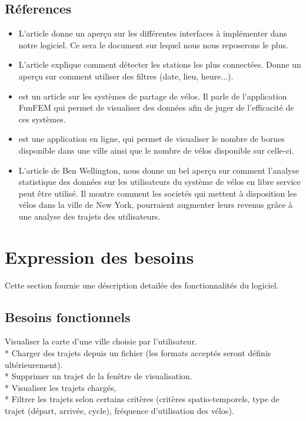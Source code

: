 \documentclass[12pt]{article}
\begin{document}
		\subsection{Réferences}
			\begin{itemize}
				\item L'article \cite{Oli16} donne un aperçu sur les différentes interfaces à implémenter dans notre logiciel. Ce sera le document sur lequel nous nous reposerons le plus.

				\item L'article \cite{Ali14} explique comment détecter les stations les plus connectées. Donne un aperçu sur comment utiliser des filtres (date, lieu, heure...).

				\item \cite{BC16} est un article sur les systèmes de partage de vélos. Il parle de l'application FunFEM qui permet de visualiser des données afin de juger de l'efficacité de ces systèmes.

				\item \cite{BSM17} est une application en ligne, qui permet de visualiser le nombre de bornes disponible dans une ville ainsi que le nombre de vélos disponible sur celle-ci.

				\item L'article \cite{BW} de Ben Wellington, nous donne un bel aperçu sur comment l'analyse statistique des données sur les utilisateurs du système de vélos en libre service peut être utilisé. Il montre comment les societés qui mettent à disposition les vélos dans la ville de New York, pourraient augmenter leurs revenus grâce à une analyse des trajets des utilisateurs.

			\end{itemize}
			
	\section{Expression des besoins}
		Cette section fournie une déscription detailée des fonctionnalités du logiciel.
		\subsection{Besoins fonctionnels}
			Visualiser la carte d’une ville choisie par l'utilisateur.\\*
			Charger des trajets depuis un fichier (les formats acceptés seront définis ultérieurement).\\*
			Supprimer un trajet de la fenêtre de visualisation.\\*
			Visualiser les trajets chargés, \\*
			Filtrer les trajets selon certains critères (critères spatio-temporels, type de trajet (départ, arrivée, cycle), fréquence d'utilisation des vélos).
\end{document}
